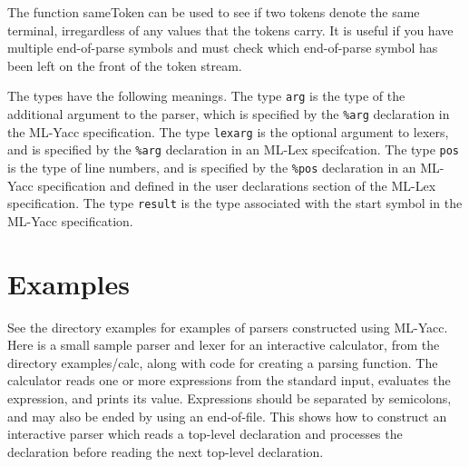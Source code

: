 The function sameToken can be used to see if two tokens
denote the same terminal, irregardless of any values that the
tokens carry.  It is useful if you have multiple end-of-parse
symbols and must check which end-of-parse symbol has been left on the
front of the token stream.

The types have the following meanings.  The type {\tt arg} is the type
of the additional argument to the parser, which is specified by the
{\tt \%arg} declaration in the ML-Yacc specification.  The type
{\tt lexarg} is the optional argument to lexers, and is specified by
the {\tt \%arg} declaration in an ML-Lex specifcation.  The type {\tt pos}
is the type of line numbers, and is specified by the {\tt \%pos} declaration
in an ML-Yacc specification and defined in the user declarations
section of the ML-Lex specification.  The type {\tt result} is
the type associated with the start symbol in the ML-Yacc specification.

\section{Examples}

  See the directory examples for examples of parsers constructed using
ML-Yacc.  Here is a small sample parser and lexer for an interactive
calculator, from the directory examples/calc, along with code for 
creating a parsing function.  The calculator reads one or
more expressions from the standard input, evaluates the expression, and
prints its value.  Expressions should be separated by semicolons, and may
also be ended by using an end-of-file.  This shows
how to construct an interactive parser which reads a top-level declaration
and processes the declaration before reading the next top-level
declaration.

